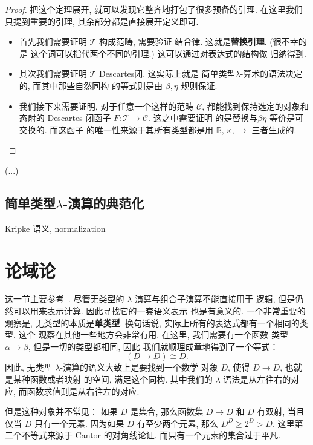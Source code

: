 \documentclass[UTF8]{ctexbook}
\theoremstyle{plain}
\theoremstyle{definition}
\theoremstyle{remark}
\begin{document}
\begin{proof}
把这个定理展开, 就可以发现它整齐地打包了很多预备的引理.
在这里我们只提到重要的引理, 其余部分都是直接展开定义即可.
\begin{itemize}
\item 首先我们需要证明 \(\mathcal T\) 构成范畴, 需要验证
结合律. 这就是\textbf{替换引理}. (很不幸的是
这个词可以指代两个不同的引理.) 这可以通过对表达式的结构做
归纳得到.
\item 其次我们需要证明 \(\mathcal T\) Descartes闭. 这实际上就是
简单类型\(\lambda\)-算术的语法决定的, 而其中那些自然同构
的等式则是由 \(\beta,\eta\) 规则保证.
\item 我们接下来需要证明, 对于任意一个这样的范畴 \(\mathcal C\),
都能找到保持选定的对象和态射的 Descartes 闭函子
\(F : \mathcal T \to \mathcal C\). 这之中需要证明
的是替换与\(\beta\eta\)-等价是可交换的. 而这函子
的唯一性来源于其所有类型都是用
\(\mathbb B, \times, \to\) 三者生成的.\qedhere
\end{itemize}
\end{proof}

(...)

\subsection{简单类型\texorpdfstring{\(\lambda\)}{Lambda}-演算的典范化}
Kripke 语义, normalization

\section{论域论}\label{beginning:domain}

这一节主要参考~\cites{abramsky:1995:domain}{cartwright:2016:domain}.
尽管无类型的 \(\lambda\)-演算与组合子演算不能直接用于
逻辑, 但是仍然可以用来表示计算. 因此寻找它的一套语义表示
也是有意义的. 一个非常重要的观察是, 无类型的本质是\textbf{单类型}.
换句话说, 实际上所有的表达式都有一个相同的类型. 这个
观察在其他一些地方会非常有用. 在这里, 我们需要有一个函数
类型 \(\alpha \to \beta\), 但是一切的类型都相同, 因此
我们就顺理成章地得到了一个等式：
\[(D \to D) \cong D.\]
因此, 无类型 \(\lambda\)-演算的语义大致上是要找到一个数学
对象 \(D\), 使得 \(D \to D\), 也就是某种函数或者映射
的空间, 满足这个同构. 其中我们的 \(\lambda\)
语法是从左往右的对应, 而函数求值则是从右往左的对应.

但是这种对象并不常见： 如果 \(D\) 是集合, 那么函数集
\(D \to D\)
和 \(D\) 有双射, 当且仅当 \(D\) 只有一个元素. 因为如果
\(D\) 有至少两个元素, 那么
\(D^D \ge 2^D > D\).
这里第二个不等式来源于 Cantor 的对角线论证.
而只有一个元素的集合过于平凡.
\end{document}
